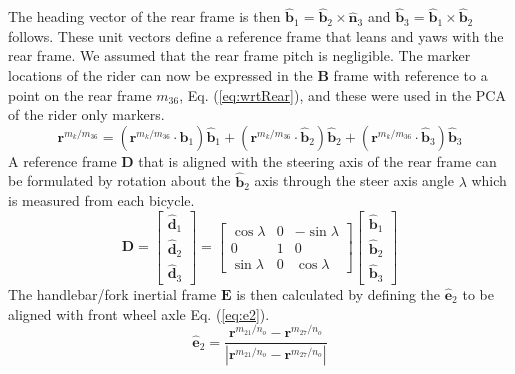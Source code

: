 The heading vector of the rear frame is then
$\hat{\mathbf{b}}_1=\hat{\mathbf{b}}_2\times\hat{\mathbf{n}}_3$ and
$\hat{\mathbf{b}}_3=\hat{\mathbf{b}}_1\times\hat{\mathbf{b}}_2$ follows. These
unit vectors define a reference frame that leans and yaws with the rear frame.
We assumed that the rear frame pitch is negligible. The marker locations of the
rider can now be expressed in the $\mathbf{B}$ frame with reference to a point
on the rear frame $m_{36}$, Eq. (\ref{eq:wrtRear}), and these were used in the
PCA of the rider only markers.
\begin{equation}
    \mathbf{r}^{{m_{k}}/m_{36}}=
    (\mathbf{r}^{{m_{k}}/m_{36}}\cdot\hat{\mathbf{b}}_1)\hat{\mathbf{b}}_1+
    (\mathbf{r}^{{m_{k}}/m_{36}}\cdot\hat{\mathbf{b}}_2)\hat{\mathbf{b}}_2+
    (\mathbf{r}^{{m_{k}}/m_{36}}\cdot\hat{\mathbf{b}}_3)\hat{\mathbf{b}}_3
\label{eq:wrtRear}
\end{equation}
A reference frame $\mathbf{D}$ that is aligned with the steering axis of the
rear frame can be formulated by rotation about the $\hat{\mathbf{b}}_2$ axis
through the steer axis angle $\lambda$ which is measured from each bicycle.
\begin{equation}
    \mathbf{D}=
    \left[
    \begin{array}{c}
    \hat{\mathbf{d}}_1\\
    \hat{\mathbf{d}}_2\\
    \hat{\mathbf{d}}_3
  \end{array}
    \right]
    =
    \left[
    \begin{array}{rrr}
    \cos{\lambda} &  0 &  -\sin{\lambda}\\
    0             &  1 &  0\\
    \sin{\lambda} &  0 & \cos{\lambda}
    \end{array}
    \right]
    \left[
    \begin{array}{c}
    \hat{\mathbf{b}}_1\\
    \hat{\mathbf{b}}_2\\
    \hat{\mathbf{b}}_3
  \end{array}
    \right]
\label{eq:Dframe}
\end{equation}
The handlebar/fork inertial frame $\mathbf{E}$ is then calculated by defining
the $\hat{\mathbf{e}}_2$ to be aligned with front wheel axle Eq.
(\ref{eq:e2}).
\begin{equation}
    \hat{\mathbf{e}}_2=\frac{\mathbf{r}^{{m_{21}}/{n_o}}-\mathbf{r}^{{m_{27}}/{n_o}}}
                            {|\mathbf{r}^{{m_{21}}/{n_o}}-\mathbf{r}^{{m_{27}}/{n_o}}|}
\label{eq:e2}
\end{equation}
